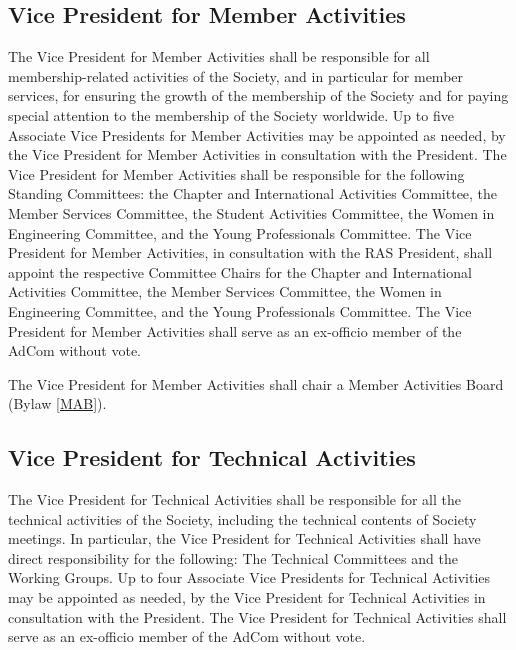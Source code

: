 \documentclass[10pt]{article}
\newcommand{\blref}[1]{Bylaw \ref{#1}}
\begin{document}
\subsection{Vice President for Member Activities}
The Vice President for Member Activities shall be responsible for all membership-related activities of the Society, and in particular for member services, for ensuring the growth of the membership of the Society and for paying special attention to the membership of the Society worldwide. Up to five Associate Vice Presidents for Member Activities may be appointed as needed, by the Vice President for Member Activities in consultation with the President. The Vice President for Member Activities shall be responsible for the following Standing Committees: the Chapter and International Activities Committee,  the Member Services Committee, the Student Activities Committee, the Women in Engineering Committee, and the Young Professionals Committee. The Vice President for Member Activities, in consultation with the RAS President, shall appoint the respective Committee Chairs for the Chapter and International Activities Committee,  the Member Services Committee, the Women in Engineering Committee, and the Young Professionals Committee.  The Vice President for Member Activities shall serve as an ex-officio member of the AdCom without vote. %


The Vice President for Member Activities shall chair a Member Activities Board (\blref{MAB}). 



\subsection{Vice President for Technical Activities}
The Vice President for Technical Activities shall be responsible for all the technical activities of the Society, including the technical contents of Society meetings. In particular, the Vice President for Technical Activities shall have direct responsibility for the following: The Technical Committees and the Working Groups. Up to four Associate Vice Presidents for Technical Activities may be appointed as needed, by the Vice President for Technical Activities in consultation with the President. The Vice President for Technical Activities shall serve as an ex-officio member of the AdCom without vote.
\end{document}
